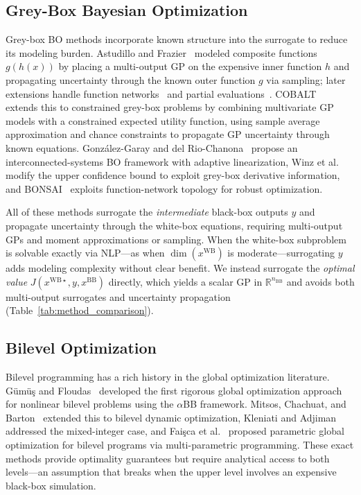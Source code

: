 \documentclass[12pt,a4paper]{article}%
\theoremstyle{plain}%
\theoremstyle{remark}%
\theoremstyle{definition}%
\def\WB{\mathrm{WB}}
\def\BB{\mathrm{BB}}
\begin{document}
\subsection{Grey-Box Bayesian Optimization}

Grey-box BO methods incorporate known structure into the surrogate to reduce its modeling burden. Astudillo and Frazier~\cite{astudillo2019bocf} modeled composite functions $g(h(x))$ by placing a multi-output GP on the expensive inner function $h$ and propagating uncertainty through the known outer function $g$ via sampling; later extensions handle function networks~\cite{astudillo2021bofn} and partial evaluations~\cite{buathong2024partial}. COBALT~\cite{paulson2022cobalt} extends this to constrained grey-box problems by combining multivariate GP models with a constrained expected utility function, using sample average approximation and chance constraints to propagate GP uncertainty through known equations. Gonz\'{a}lez-Garay and del Rio-Chanona~\cite{gonzalez2025bois} propose an interconnected-systems BO framework with adaptive linearization, Winz et al.~\cite{winz2025greybox} modify the upper confidence bound to exploit grey-box derivative information, and BONSAI~\cite{kudva2026bonsai} exploits function-network topology for robust optimization.

All of these methods surrogate the \emph{intermediate} black-box outputs $y$ and propagate uncertainty through the white-box equations, requiring multi-output GPs and moment approximations or sampling. When the white-box subproblem is solvable exactly via NLP---as when $\dim(x^{\WB})$ is moderate---surrogating $y$ adds modeling complexity without clear benefit. We instead surrogate the \emph{optimal value} $J(x^{\WB\star}, y, x^{\BB})$ directly, which yields a scalar GP in $\mathbb{R}^{n_{\BB}}$ and avoids both multi-output surrogates and uncertainty propagation (Table~\ref{tab:method_comparison}).

\subsection{Bilevel Optimization}

Bilevel programming has a rich history in the global optimization literature. G\"{u}m\"{u}\c{s} and Floudas~\cite{gumus2001bilevel} developed the first rigorous global optimization approach for nonlinear bilevel problems using the $\alpha$BB framework. Mitsos, Chachuat, and Barton~\cite{mitsos2009bilevel_dynamic} extended this to bilevel dynamic optimization, Kleniati and Adjiman~\cite{kleniati2014bilevel} addressed the mixed-integer case, and Fai\c{s}ca et al.~\cite{faisca2007bilevel} proposed parametric global optimization for bilevel programs via multi-parametric programming. These exact methods provide optimality guarantees but require analytical access to both levels---an assumption that breaks when the upper level involves an expensive black-box simulation.
\end{document}
